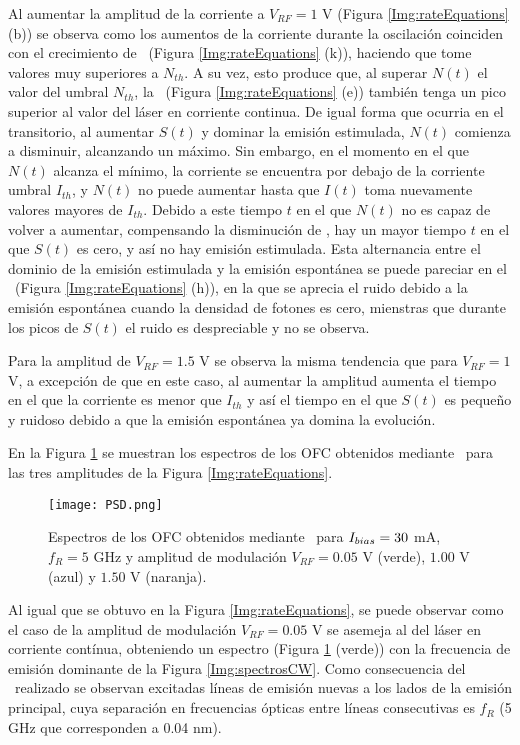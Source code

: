 		Al aumentar la amplitud de la corriente a $V_{RF} = 1$ V (Figura \ref{Img:rateEquations} (b)) se observa como los aumentos de la corriente durante la oscilaci\'on coinciden con el crecimiento de \n\ (Figura \ref{Img:rateEquations} (k)), haciendo que tome valores muy superiores a $N_{th}$. A su vez, esto produce que, al superar $N(t)$ el valor del umbral $N_{th}$, la \s\ (Figura \ref{Img:rateEquations} (e)) tambi\'en tenga un pico superior al valor del l\'aser en corriente continua. De igual forma que ocurria en el transitorio, al aumentar $S(t)$ y dominar la emisi\'on estimulada, $N(t)$ comienza a disminuir, alcanzando un m\'aximo. Sin embargo, en el momento en el que $N(t)$ alcanza el m\'inimo, la corriente se encuentra por debajo de la corriente umbral $I_{th}$, y $N(t)$ no puede aumentar hasta que $I(t)$ toma nuevamente valores mayores de $I_{th}$. Debido a este tiempo $t$ en el que $N(t)$ no es capaz de volver a aumentar, compensando la disminuci\'on de \s, hay un mayor tiempo $t$ en el que $S(t)$ es cero, y as\'i no hay emisi\'on estimulada. Esta alternancia entre el dominio de la emisi\'on estimulada y la emisi\'on espont\'anea se puede pareciar en el \chirp\ (Figura \ref{Img:rateEquations} (h)), en la que se aprecia el ruido debido a la emisión espont\'anea cuando la densidad de fotones es cero, mienstras que durante los picos de $S(t)$ el ruido es despreciable y no se observa.
			
		Para la amplitud de $V_{RF} = 1.5$ V se observa la misma tendencia que para $V_{RF} = 1$ V, a excepci\'on de que en este caso, al aumentar la amplitud aumenta el tiempo en el que la corriente es menor que $I_{th}$ y as\'i el tiempo en el que $S(t)$ es pequeño y ruidoso debido a que la emisi\'on espontánea ya domina la evolución.


		En la Figura \ref{Img:PSD} se muestran los espectros de los OFC obtenidos mediante \gs\ para las tres amplitudes de la Figura \ref{Img:rateEquations}.

			\begin{figure}[H]
				\centering
				\texttt{[image: PSD.png]}
				\caption{\label{Img:PSD}Espectros de los OFC obtenidos mediante \gs\ para $I_{bias} = 30$ mA, $f_R = 5$ GHz y amplitud de modulaci\'on $V_{RF} = 0.05$ V (verde), $1.00$ V (azul) y $1.50$ V (naranja).}
			\end{figure}
			
		Al igual que se obtuvo en la Figura \ref{Img:rateEquations}, se puede observar como el caso de la amplitud de modulaci\'on $V_{RF} = 0.05$ V se asemeja al del l\'aser en corriente cont\'inua, obteniendo un espectro (Figura \ref{Img:PSD} (verde)) con la frecuencia de emisi\'on dominante de la Figura \ref{Img:spectrosCW}. Como consecuencia del \gs\ realizado se observan excitadas líneas de emisión nuevas a los lados de la emisi\'on principal, cuya separación en frecuencias ópticas entre líneas consecutivas es $f_R$ (5 GHz que corresponden a 0.04 nm).

